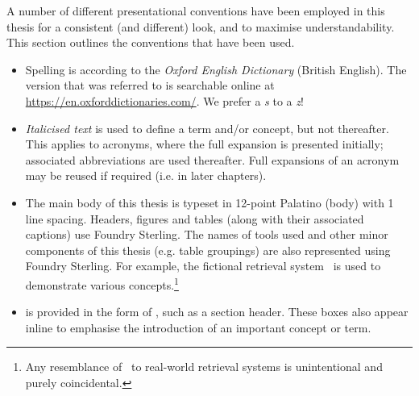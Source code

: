 
\begin{preamble}
{}

A number of different presentational conventions have been employed in this thesis for a consistent (and different) look, and to maximise understandability. This section outlines the conventions that have been used.



\noindent{}
\begin{itemize}
    \item{Spelling is according to the \emph{Oxford English Dictionary} (British English). The version that was referred to is searchable online at \url{https://en.oxforddictionaries.com/}. We prefer a \emph{s} to a \emph{z}!}
\end{itemize}

\noindent{}
\begin{itemize}
    \item{\emph{Italicised text} is used to define a term and/or concept, but not thereafter. This applies to acronyms, where the full expansion is presented initially; associated abbreviations are used thereafter. Full expansions of an acronym may be reused if required (i.e. in later chapters).}
    
    \item{The main body of this thesis is typeset in 12-point Palatino (body) with 1 line spacing. Headers, figures and tables (along with their associated captions) use \headerfont\selectfont Foundry Sterling\normalfont\selectfont. The names of tools used and other minor components of this thesis (e.g. table groupings) are also represented using \headerfont\selectfont Foundry Sterling\normalfont\selectfont. For example, the fictional retrieval system \searchlogo~is used to demonstrate various concepts.\footnote{Any resemblance of \searchlogo~to real-world retrieval systems is unintentional and purely coincidental.}}
    
    \item{ is provided in the form of , such as a section header. These boxes also appear inline to emphasise the introduction of an important concept or term.}
    
    \begin{itemize}
        

\end{itemize}
\end{itemize}
\end{preamble}
